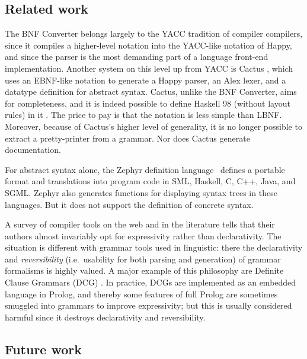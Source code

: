 \documentclass[10pt]{article}
\begin{document}
\subsection{Related work}

The BNF Converter belongs largely to the YACC \cite{johnson-yacc} 
tradition of compiler compilers,
since it compiles a higher-level notation into the
YACC-like notation of Happy, and since the parser
is the most demanding part of a language front-end implementation.
Another system on this 
level up from YACC is Cactus \cite{Cactus},
which uses an EBNF-like notation to 
generate a Happy parser, an Alex lexer, 
and a datatype definition for abstract syntax.
Cactus, unlike the BNF Converter, aims for completeness,
and it is indeed possible to define Haskell 98 (without layout rules) in it
\cite{haskell98-Cactus}. The price to pay is that the
notation is less simple than LBNF. Moreover, because of Cactus's
higher level of generality, it is no
longer possible to extract a 
pretty-printer from a grammar. Nor does Cactus
generate documentation.

For abstract syntax alone, the Zephyr definition language \cite{zephyr}\ defines
a portable format and translations into program code in SML, Haskell, C, C++,
Java, and SGML. Zephyr also generates functions for displaying syntax trees
in these languages. But it does not support the definition of concrete syntax.

A survey of compiler tools on the web and in the literature tells that their
authors almost invariably opt for expressivity rather than declarativity.
The situation is different with grammar tools used in linguistic: there
the declarativity and \textit{reversibility} (i.e.\ usability for both
parsing and generation) of grammar formalisms is highly valued. A major 
example of this philosophy are Definite Clause Grammars (DCG) \cite{dcg}.
In practice, DCGs are implemented as an embedded language in Prolog, and thereby
some features of full Prolog are sometimes smuggled into grammars to improve
expressivity; but this is usually considered harmful since it destroys
declarativity and reversibility.



\subsection{Future work}
\end{document}
